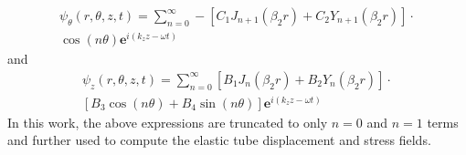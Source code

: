 \documentclass[twocolumn,10pt]{asme2ej}
\begin{document}
\begin{multline}\label{Vector potential equation theta}
    \psi_{\theta}(r,\theta,z,t) = \sum_{n=0}^{\infty}-\left[C_{1}J_{n+1}(\beta_2 r) + C_{2}Y_{n+1}(\beta_2 r)\right]\cdot\\ \cos(n\theta)\mathbf{e}^{i(k_{z}z-\omega t)}
\end{multline}
and
\begin{multline}\label{Vector potential equation z}
    \psi_{z}(r,\theta,z,t) = \sum_{n=0}^{\infty}\left[B_{1}J_{n}(\beta_2 r) + B_{2}Y_{n}(\beta_2 r)\right]\cdot\\ \left[B_{3}\cos(n\theta) + B_{4}\sin(n\theta)\right]\mathbf{e}^{i(k_{z}z-\omega t)}
\end{multline}
In this work, the above expressions are truncated to only $n=0$ and $n=1$ terms and further used to compute the elastic tube displacement and stress fields.
\end{document}
